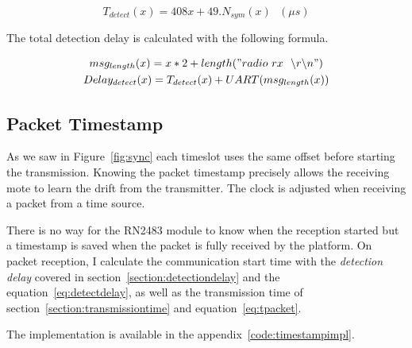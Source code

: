\begin{equation}
  \label{eq:detectcomp}
  T_{detect}(x) = 408x + 49 . N_{sym}(x) \ \ \ (\mu s)
\end{equation}

The total detection delay is calculated with the following formula.

\begin{gather}
  msg_{length}(x) = x * 2 + length("radio~rx~~\backslash r \backslash n") \\
  \label{eq:detectdelay}
  Delay_{detect}(x) = T_{detect}(x) + UART(msg_{length}(x))
\end{gather}

\subsection{Packet Timestamp}

As we saw in Figure~\ref{fig:sync} each timeslot uses the same offset before 
starting the transmission.
Knowing the packet timestamp precisely allows the receiving mote to learn the
drift from the transmitter. 
The clock is adjusted when receiving a packet from a time source.

There is no way for the RN2483 module to know when the reception started but
a timestamp is saved when the packet is fully received by the platform.
On packet reception, I calculate the communication start time with the 
\emph{detection delay} covered in section~\ref{section:detectiondelay} and the
equation~\ref{eq:detectdelay}, as well as the transmission time of
section~\ref{section:transmissiontime} and equation~\ref{eq:tpacket}.

The implementation is available in the appendix~\ref{code:timestampimpl}.




